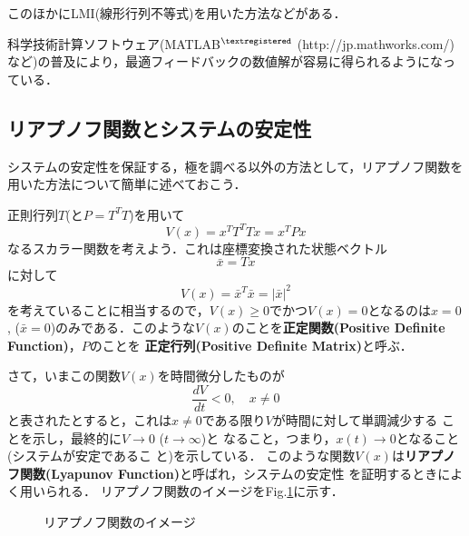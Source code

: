 このほかにLMI(線形行列不等式)\cite{ebihara}を用いた方法などがある．

科学技術計算ソフトウェア(MATLAB$^{\tiny \textregistered}$ (http://jp.mathworks.com/)など)の普及により，最適フィードバックの数値解が容易に得られるようになっている．


\subsection{リアプノフ関数とシステムの安定性}
システムの安定性を保証する，極を調べる以外の方法として，リアプノフ関数を用いた方法について簡単に述べておこう．

正則行列$T$(と$P=T^T T$)を用いて
\begin{equation}
 V(x) = x^T T^T T x = x^T P x
\end{equation}
なるスカラー関数を考えよう．これは座標変換された状態ベクトル
\begin{equation}
 \bar{x} = T x
\end{equation}
に対して
\begin{equation}
 V(x) = \bar{x}^T \bar{x} = | \bar{x} | ^2
\end{equation}
を考えていることに相当するので，$V(x) \geq 0$でかつ$V(x) = 0$となるのは$x=0$
, ($\bar{x} = 0 $)のみである．このような$V(x)$のことを{\bf 正定関数(Positive Definite Function)}，$P$のことを
{\bf 正定行列(Positive Definite Matrix)}と呼ぶ．

さて，いまこの関数$V(x)$を時間微分したものが
\begin{equation}
 \frac{d V}{d t} < 0, \quad x \neq 0
  \label{lyapunov_1}
\end{equation}
と表されたとすると，これは$x \neq 0$である限り$V$が時間に対して単調減少する
ことを示し，最終的に$ V \rightarrow 0$ ($t \rightarrow \infty$)と
なること，つまり，$x(t) \rightarrow 0$となること(システムが安定であるこ
と)を示している．
このような関数$V(x)$は{\bf リアプノフ関数(Lyapunov Function)}と呼ばれ，システムの安定性
を証明するときによく用いられる．
リアプノフ関数のイメージをFig.\ref{fig:lyapunov}に示す．

\begin{figure}[htbp]
 \begin{center}
  \caption{リアプノフ関数のイメージ}
  \label{fig:lyapunov}
 \end{center}
\end{figure}


